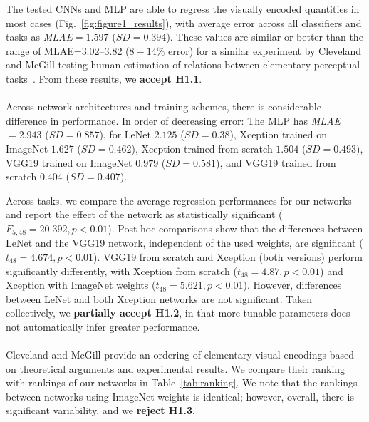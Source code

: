  The tested CNNs and MLP are able to regress the visually encoded quantities in most cases (Fig.~\ref{fig:figure1_results}), with average error across all classifiers and tasks as \textit{MLAE}$=1.597$ ($SD=0.394$). %
These values are similar or better than the range of MLAE=$3.02$--$3.82$ ($8-14\%$ error) for a similar experiment by Cleveland and McGill testing human estimation of relations between elementary perceptual tasks~\cite{cleveland1985graphical}. From these results, we \textbf{accept H1.1}.
\\~\\
Across network architectures and training schemes, there is considerable difference in performance. In order of decreasing error: 
The MLP has \textit{MLAE}$=2.943$ ($SD=0.857$), 
for LeNet $2.125$ ($SD=0.38$), 
Xception trained on ImageNet $1.627$ ($SD=0.462$), 
Xception trained from scratch $1.504$ ($SD=0.493$),
VGG19 trained on ImageNet $0.979$ ($SD=0.581$), 
and VGG19 trained from scratch $0.404$ ($SD=0.407$).

Across tasks, we compare the average regression performances for our networks and report the effect of the network as statistically significant ($F_{5,48}=20.392,p<0.01$). Post hoc comparisons show that the differences between LeNet and the VGG19 network, independent of the used weights, are significant ($t_48=4.674,p<0.01$). VGG19 from scratch and Xception (both versions) perform significantly differently, with Xception from scratch ($t_48=4.87,p<0.01$) and Xception with ImageNet weights ($t_48=5.621,p<0.01$). However, differences between LeNet and both Xception networks are not significant. Taken collectively, we \textbf{partially accept H1.2}, in that more tunable parameters does not automatically infer greater performance.
\\~\\
 Cleveland and McGill provide an ordering of elementary visual encodings based on theoretical arguments and experimental results. We compare their ranking with rankings of our networks in Table~\ref{tab:ranking}. We note that the rankings between networks using ImageNet weights is identical; however, overall, there is significant variability, and we \textbf{reject H1.3}. 

